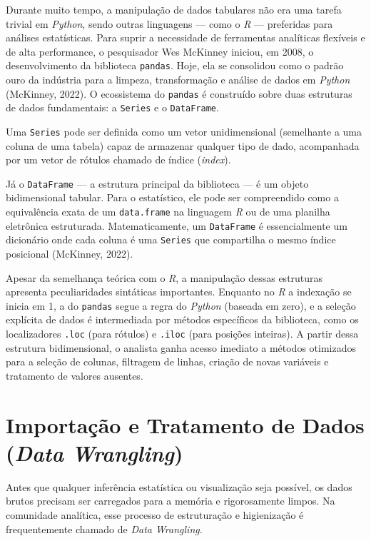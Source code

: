 \documentclass[
  brazilian,
  letterpaper,
  DIV=11,
  numbers=noendperiod]{scrreprt}
\begin{document}
Durante muito tempo, a manipulação de dados tabulares não era uma tarefa
trivial em \emph{Python}, sendo outras linguagens --- como o \emph{R}
--- preferidas para análises estatísticas. Para suprir a necessidade de
ferramentas analíticas flexíveis e de alta performance, o pesquisador
Wes McKinney iniciou, em 2008, o desenvolvimento da biblioteca
\texttt{pandas}. Hoje, ela se consolidou como o padrão ouro da indústria
para a limpeza, transformação e análise de dados em \emph{Python}
(McKinney, 2022). O ecossistema do \texttt{pandas} é construído sobre
duas estruturas de dados fundamentais: a \texttt{Series} e o
\texttt{DataFrame}.

Uma \texttt{Series} pode ser definida como um vetor unidimensional
(semelhante a uma coluna de uma tabela) capaz de armazenar qualquer tipo
de dado, acompanhada por um vetor de rótulos chamado de índice
(\emph{index}).

Já o \texttt{DataFrame} --- a estrutura principal da biblioteca --- é um
objeto bidimensional tabular. Para o estatístico, ele pode ser
compreendido como a equivalência exata de um \texttt{data.frame} na
linguagem \emph{R} ou de uma planilha eletrônica estruturada.
Matematicamente, um \texttt{DataFrame} é essencialmente um dicionário
onde cada coluna é uma \texttt{Series} que compartilha o mesmo índice
posicional (McKinney, 2022).

Apesar da semelhança teórica com o \emph{R}, a manipulação dessas
estruturas apresenta peculiaridades sintáticas importantes. Enquanto no
\emph{R} a indexação se inicia em 1, a do \texttt{pandas} segue a regra
do \emph{Python} (baseada em zero), e a seleção explícita de dados é
intermediada por métodos específicos da biblioteca, como os
localizadores \texttt{.loc} (para rótulos) e \texttt{.iloc} (para
posições inteiras). A partir dessa estrutura bidimensional, o analista
ganha acesso imediato a métodos otimizados para a seleção de colunas,
filtragem de linhas, criação de novas variáveis e tratamento de valores
ausentes.

\section{\texorpdfstring{Importação e Tratamento de Dados (\emph{Data
Wrangling})}{Importação e Tratamento de Dados (Data Wrangling)}}\label{importauxe7uxe3o-e-tratamento-de-dados-data-wrangling}

Antes que qualquer inferência estatística ou visualização seja possível,
os dados brutos precisam ser carregados para a memória e rigorosamente
limpos. Na comunidade analítica, esse processo de estruturação e
higienização é frequentemente chamado de \emph{Data Wrangling}.
\end{document}

